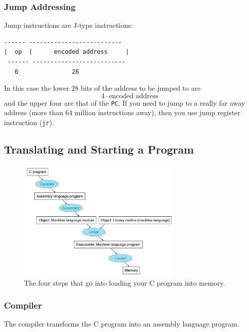 \documentclass[10pt]{article}
\begin{document}
\subsubsection{Jump Addressing}
Jump instructions are J-type instructions:
\begin{lstlisting}[style=CStyle, numbers=none, xleftmargin=5.0ex, aboveskip=1em, belowskip=1em, numberstyle=\color{blue}, escapeinside=..]
 ------ --------------------------
|  op  |      encoded address     |
 ------ --------------------------
   6               26
\end{lstlisting}
In this case the lower $28$ bits of the address to be jumped to are
\[4 \cdot \text{encoded address}\]
and the upper four are that of the \texttt{PC}.  If you need to jump to a really far away address (more than 64 million instructions away), then you use jump register instruction (\texttt{jr}).
\addtocounter{subsection}{1}
\subsection{Translating and Starting a Program}\label{subsec:}
\begin{figure}[H]
  \centering
  \includegraphics[width=8cm]{18.png}
  \caption{The four steps that go into loading your C program into memory.}
  \label{fig:}
\end{figure}
\subsubsection{Compiler}
The compiler transforms the C program into an assembly language program.
\end{document}
